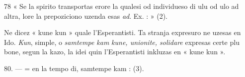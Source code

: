 \begin{VUpage}[82]{78}
« Se la spirito transportas erore la qualesi od individueso\nl
di ulu od ulo ad altra, lore la prepoziciono uzenda esas \textit{ad}.\nl
Ex. : \cc
{} » (2).

Ne dicez « kune kun » quale l'Esperantisti. Ta stranja\nl
expresuro ne uzesas en Ido. \textit{Kun}, simple, o \textit{samtempe kam}\nl
\textit{kune, unionite, solidare} expresas certe plu bone, segun la\nl
kazo, la idei quin l'Esperantisti inkluzas en « kune kun ».

\VUblanc{5.73pt}%
80. ---  = en la tempo di, samtempe kam : \nl
{}\nl
{} (3).
\end{VUpage}


